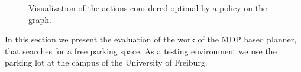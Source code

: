 \begin{figure}[b]%
\centering
{}\hspace{2mm}
\hspace{2mm}
\hspace{2mm}
\hspace{2mm}
\caption{Visualization of the actions considered optimal by a policy on the graph.}
\label{fig:actions}
\end{figure}

In this section we present the evaluation of the work of the MDP based
planner, that searches for a free parking space. As a testing environment we
use the parking lot at the campus of the University of Freiburg.


